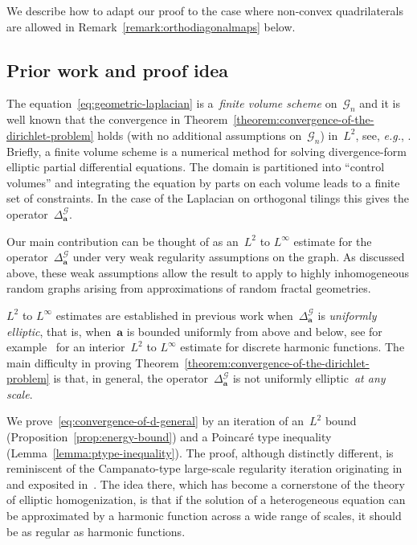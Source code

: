 \documentclass[12pt]{amsart}
\numberwithin{equation}{section}
\newcommand{\eg}{{\it e.g.}}
\newcommand{\G}{\mathcal{G}}
\newcommand{\aDelta}{\hyperref[eq:geometric-laplacian]{{\Delta^{\mathcal{G}}_{\cond}}}}
\newcommand{\cond}{\hyperref[eq:geometric-laplacian]{\mathbf{a}}}
\begin{document}
We describe how to adapt our proof to the case where non-convex quadrilaterals are allowed in Remark~\ref{remark:orthodiagonalmaps} below.




\subsection{Prior work and proof idea}
\label{subsec:prior}

The equation~\eqref{eq:geometric-laplacian} is a~\emph{finite volume scheme} on~$\G_n$ and it is well known that the convergence in Theorem~\ref{theorem:convergence-of-the-dirichlet-problem} holds (with no additional assumptions on~$\G_n$) in~$L^2$, see, \eg, \cite[Theorem 9.3]{eymard2000finite}. Briefly, a finite volume scheme is a numerical method for solving divergence-form elliptic partial differential equations. The domain is partitioned into ``control volumes'' and integrating the equation by parts
on each volume leads to a finite set of constraints. In the case of the Laplacian on orthogonal tilings this gives the operator~$\aDelta$. 

 Our main contribution can be thought of as an~$L^2$ to $L^{\infty}$ estimate for the operator~$\aDelta$ under very weak regularity assumptions on the graph.  As discussed above, these weak assumptions allow the result to apply to highly inhomogeneous random graphs arising from approximations of random fractal geometries. 

$L^2$ to $L^\infty$ estimates are established in previous work when~$\aDelta$ is \emph{uniformly elliptic}, that is, when~$\cond$ is bounded uniformly from above and below, see for example~\cite[Proposition 5.3]{delmotte} for an interior~$L^2$ to $L^{\infty}$ estimate for discrete harmonic functions. The main difficulty in proving Theorem~\ref{theorem:convergence-of-the-dirichlet-problem} is that, in general, the operator~$\aDelta$ is not uniformly elliptic~\emph{at any scale}. 

We prove~\eqref{eq:convergence-of-d-general} by an iteration of an~$L^2$ bound (Proposition~\ref{prop:energy-bound}) and a Poincar\'e type inequality (Lemma~\ref{lemma:ptype-inequality}). The proof, although distinctly different, is reminiscent of the Campanato-type large-scale regularity iteration originating in~\cite{armstrongsmart} and exposited in~\cite[Chapter 4]{AKMBook}. The idea there, which has become a cornerstone of the theory of elliptic homogenization, is that if the solution 
of a heterogeneous equation can be approximated by a harmonic function across a wide range of scales, it should be as regular as harmonic functions.
\end{document}
